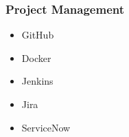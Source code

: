 \documentclass[letterpaper]{article}
\begin{document}
\begin{fullwidth}[width=\linewidth+2cm]
\begin{minipage}[t]{0.25\linewidth}
\begin{tcolorbox}[breakable, capture=minipage, title=Skills]
    \subsubsection*{Project Management}
    \begin{itemize}
    \item GitHub
      \item Docker \item Jenkins
    \item Jira
    \item ServiceNow
    \end{itemize} %
  \end{tcolorbox}
\end{minipage}


\end{fullwidth}
\end{document}
